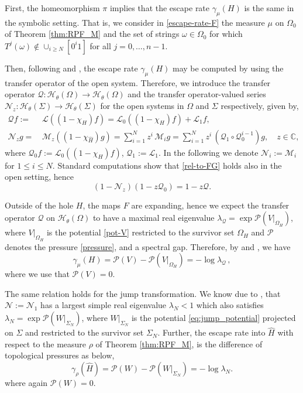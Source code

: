 \documentclass{amsart}
\theoremstyle{definition}
\theoremstyle{remark}
\theoremstyle{definition}
\numberwithin{equation}{section}
\newcommand{\C}{\mathbb C}
\newcommand{\CH}{{\mathcal H}}
\newcommand{\CL}{{\mathcal L}}
\newcommand{\CM}{{\mathcal M}}
\newcommand{\CN}{{\mathcal N}}
\newcommand{\CP}{{\mathcal P}}
\newcommand{\CQ}{{\mathcal Q}}
\newcommand{\CW}{{W}}
\begin{document}
First, the homeomorphism $\pi$ implies that the escape rate $\gamma_\mu(H)$ is the same in the symbolic setting. That is, we consider in \eqref{escape-rate-F} the measure $\mu$ on $\Omega_0$ of Theorem \ref{thm:RPF_M} and the set of strings $\omega\in \Omega_0$ for which $T^j(\omega) \not\in \cup_{i \ge N} [0^{i} 1]$ for all $j=0,\dots,n-1$.
    
Then, following \cite{DY} and \cite[Section 7.1]{DT}, the escape rate $\gamma_\mu(H)$ may be computed by using the transfer operator of the open system. Therefore, we introduce the transfer operator $\CQ : \CH_{\theta}(\Omega) \to \CH_{\theta}(\Omega)$ and the transfer operator-valued series $\CN_z:\CH_{\theta}(\Sigma) \to \CH_{\theta}(\Sigma)$ for the open systems in $\Omega$ and $\Sigma$ respectively, given by,
\[
\begin{aligned}
\CQ f := &\, \CL ((1-\chi_{H})f) = \CL_{0} ((1-\chi_{H})f) + \CL_{1}f, \\[0.2cm]
\CN_z g = &\,  \CM_z((1-\chi_{\hat{H}})g) = \sum\limits_{i=1}^{N} z^i\, \CM_i g = \sum\limits_{i=1}^{N} z^i\, (\CQ_1 \circ \CQ_0^{i-1}) g, \quad z\in \C,
\end{aligned}
\]
where $\CQ_{0}f:= \CL_{0} ((1-\chi_{H})f)$, $\CQ_{1}:= \CL_{1}$. In the following we denote $\CN_i := \CM_i$ for $1 \le i \le N$. Standard computations show that \eqref{rel-to-FG} holds also in the open setting, hence 
\begin{equation}\label{eq:relation_N_Q}
    (1-\CN_z)(1-z\CQ_{0}) = 1-z\CQ.
\end{equation}

Outside of the hole $H$, the maps $F$ are expanding, hence we expect the transfer operator $\CQ$ on $\CH_{\theta}(\Omega)$ to have a maximal real eigenvalue $\lambda_{\CQ} = \exp \CP(V|_{\Omega_H})$, where $V|_{\Omega_H}$ is the potential \eqref{pot-V} restricted to the survivor set $\Omega_H$ and $\CP$ denotes the pressure \eqref{pressure}, and a spectral gap. Therefore, by \cite{DY} and \cite[Section 7.1]{DT}, we have
\begin{equation}\label{escape-rate-T-to}
\gamma_\mu(H) = \CP(V) - \CP(V|_{\Omega_H}) = -\log \lambda_{\CQ}\, ,
\end{equation}
where we use that $\CP(V)=0$.

The same relation holds for the jump transformation. We know due to \cite{Tanaka}, that $\CN:= \CN_1$ has a largest simple real eigenvalue $\lambda_{N} < 1$ which also satisfies $ \lambda_{N} = \exp \CP(\CW|_{\Sigma_{N}})$, where $\CW|_{\Sigma_{N}}$ is the potential \eqref{eq:jump_potential} projected on $\Sigma$ and restricted to the survivor set $\Sigma_N$. Further, the escape rate into $\hat{H}$ with respect to the measure $\rho$ of Theorem \ref{thm:RPF_M}, is the difference of topological pressures as below,
\begin{equation}\label{escape-rate-S-to} 
        \gamma_\rho(\hat{H}) = \CP(\CW) - \CP(\CW|_{\Sigma_{N}}) = -\log \lambda_{N}. 
\end{equation}
where again $\CP(\CW)=0$.
\end{document}

